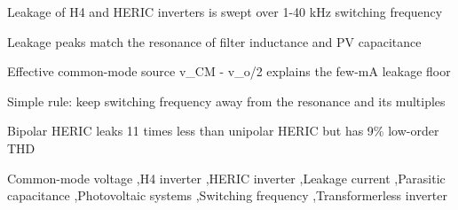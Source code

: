 \documentclass[preprint,12pt]{elsarticle}
\begin{document}
\begin{frontmatter}
\begin{highlights}
\item Leakage of H4 and HERIC inverters is swept over 1-40 kHz switching frequency
\item Leakage peaks match the resonance of filter inductance and PV capacitance
\item Effective common-mode source v\_CM - v\_o/2 explains the few-mA leakage floor
\item Simple rule: keep switching frequency away from the resonance and its multiples
\item Bipolar HERIC leaks 11 times less than unipolar HERIC but has 9\% low-order THD
\end{highlights}

\begin{keyword}
Common-mode voltage \sep H4 inverter \sep HERIC inverter \sep Leakage current \sep Parasitic capacitance \sep Photovoltaic systems \sep Switching frequency \sep Transformerless inverter
\end{keyword}

\end{frontmatter}

\linenumbers














\appendix








\end{document}
